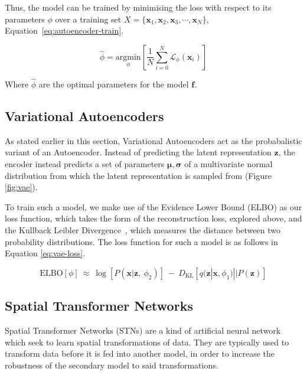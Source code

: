 \documentclass[twocolumn]{article}
\begin{document}
Thus, the model can be trained by minimising the loss with respect to its parameters \(\phi\) over a training set \(X = \{\mathbf{x}_1, \mathbf{x}_2, \mathbf{x}_3, \cdots, \mathbf{x}_N\}\), Equation~\ref{eq:autoencoder-train}.

\begin{equation}\label{eq:autoencoder-train}
    \hat{\phi} = \underset{\phi}{\text{argmin}} \left[\frac{1}{N} \sum^N_{i=0}\mathcal{L}_\phi(\mathbf{x}_i)\right]
\end{equation}

Where \(\hat{\phi}\) are the optimal parameters for the model \(\mathbf{f}\). 

\subsection{Variational Autoencoders}

As stated earlier in this section, Variational Autoencoders act as the probabalistic variant of an Autoencoder. Instead of predicting the latent representation \(\mathbf{z}\), the encoder instead predicts a set of parameters \(\boldsymbol{\mu}, \boldsymbol{\sigma}\) of a multivariate normal distribution from which the latent representation is sampled from (Figure \ref{fig:vae}). 

To train such a model, we make use of the Evidence Lower Bound (ELBO) as our loss function, which takes the form of the reconstruction loss, explored above, and the Kullback Leibler Divergence~\cite{kullback1951information}, which measures the distance between two probability distributions. The loss function for such a model is as follows in Equation \ref{eq:vae-loss}. 

\begin{equation}\label{eq:vae-loss}
    \text{ELBO} \left[\phi\right]~ \approx~\log \left[P(\mathbf{x}|\mathbf{z},~\phi_2)\right]~-~D_\text{KL}\left[q(\mathbf{z}|\mathbf{x}, \phi_1)||P(\mathbf{z})\right]
\end{equation}

\subsection{Spatial Transformer Networks}

Spatial Transformer Networks (STNs) are a kind of artificial neural network which seek to learn spatial transformations of data. They are typically used to transform data before it is fed into another model, in order to increase the robustness of the secondary model to said transformations. 
\end{document}
